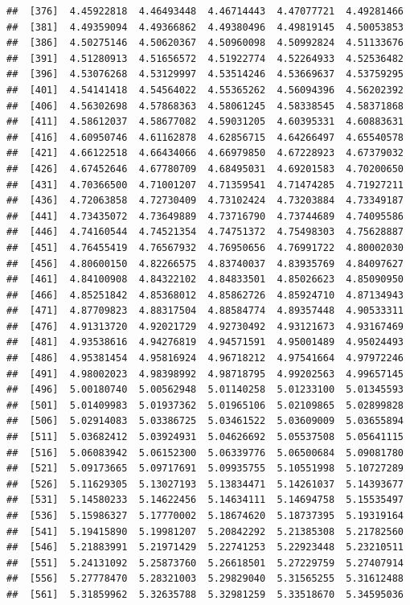 \documentclass[
  11pt]{report}
\begin{document}
\begin{itemize}
\begin{verbatim}
##  [376]  4.45922818  4.46493448  4.46714443  4.47077721  4.49281466
##  [381]  4.49359094  4.49366862  4.49380496  4.49819145  4.50053853
##  [386]  4.50275146  4.50620367  4.50960098  4.50992824  4.51133676
##  [391]  4.51280913  4.51656572  4.51922774  4.52264933  4.52536482
##  [396]  4.53076268  4.53129997  4.53514246  4.53669637  4.53759295
##  [401]  4.54141418  4.54564022  4.55365262  4.56094396  4.56202392
##  [406]  4.56302698  4.57868363  4.58061245  4.58338545  4.58371868
##  [411]  4.58612037  4.58677082  4.59031205  4.60395331  4.60883631
##  [416]  4.60950746  4.61162878  4.62856715  4.64266497  4.65540578
##  [421]  4.66122518  4.66434066  4.66979850  4.67228923  4.67379032
##  [426]  4.67452646  4.67780709  4.68495031  4.69201583  4.70200650
##  [431]  4.70366500  4.71001207  4.71359541  4.71474285  4.71927211
##  [436]  4.72063858  4.72730409  4.73102424  4.73203884  4.73349187
##  [441]  4.73435072  4.73649889  4.73716790  4.73744689  4.74095586
##  [446]  4.74160544  4.74521354  4.74751372  4.75498303  4.75628887
##  [451]  4.76455419  4.76567932  4.76950656  4.76991722  4.80002030
##  [456]  4.80600150  4.82266575  4.83740037  4.83935769  4.84097627
##  [461]  4.84100908  4.84322102  4.84833501  4.85026623  4.85090950
##  [466]  4.85251842  4.85368012  4.85862726  4.85924710  4.87134943
##  [471]  4.87709823  4.88317504  4.88584774  4.89357448  4.90533311
##  [476]  4.91313720  4.92021729  4.92730492  4.93121673  4.93167469
##  [481]  4.93538616  4.94276819  4.94571591  4.95001489  4.95024493
##  [486]  4.95381454  4.95816924  4.96718212  4.97541664  4.97972246
##  [491]  4.98002023  4.98398992  4.98718795  4.99202563  4.99657145
##  [496]  5.00180740  5.00562948  5.01140258  5.01233100  5.01345593
##  [501]  5.01409983  5.01937362  5.01965106  5.02109865  5.02899828
##  [506]  5.02914083  5.03386725  5.03461522  5.03609009  5.03655894
##  [511]  5.03682412  5.03924931  5.04626692  5.05537508  5.05641115
##  [516]  5.06083942  5.06152300  5.06339776  5.06500684  5.09081780
##  [521]  5.09173665  5.09717691  5.09935755  5.10551998  5.10727289
##  [526]  5.11629305  5.13027193  5.13834471  5.14261037  5.14393677
##  [531]  5.14580233  5.14622456  5.14634111  5.14694758  5.15535497
##  [536]  5.15986327  5.17770002  5.18674620  5.18737395  5.19319164
##  [541]  5.19415890  5.19981207  5.20842292  5.21385308  5.21782560
##  [546]  5.21883991  5.21971429  5.22741253  5.22923448  5.23210511
##  [551]  5.24131092  5.25873760  5.26618501  5.27229759  5.27407914
##  [556]  5.27778470  5.28321003  5.29829040  5.31565255  5.31612488
##  [561]  5.31859962  5.32635788  5.32981259  5.33518670  5.34595036

\end{verbatim}
\end{itemize}
\end{document}
